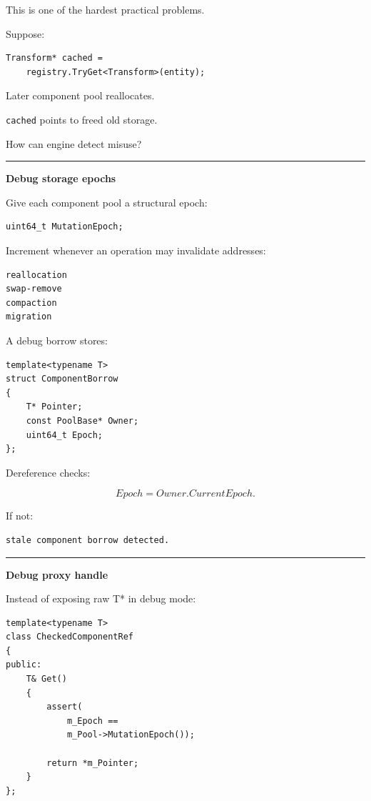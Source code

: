 This is one of the hardest practical problems.

Suppose:

\begin{verbatim}
Transform* cached =
    registry.TryGet<Transform>(entity);
\end{verbatim}

Later component pool reallocates.

\texttt{cached} points to freed old storage.

How can engine detect misuse?

\begin{center}\rule{0.5\linewidth}{0.5pt}\end{center}

\textbf{Debug storage epochs}

Give each component pool a structural epoch:

\begin{verbatim}
uint64_t MutationEpoch;
\end{verbatim}

Increment whenever an operation may invalidate addresses:

\begin{verbatim}
reallocation
swap-remove
compaction
migration
\end{verbatim}

A debug borrow stores:

\begin{verbatim}
template<typename T>
struct ComponentBorrow
{
    T* Pointer;
    const PoolBase* Owner;
    uint64_t Epoch;
};
\end{verbatim}

Dereference checks:

\[
Epoch=Owner.CurrentEpoch.
\]

If not:

\begin{verbatim}
stale component borrow detected.
\end{verbatim}

\begin{center}\rule{0.5\linewidth}{0.5pt}\end{center}

\textbf{Debug proxy handle}

Instead of exposing raw T* in debug mode:

\begin{verbatim}
template<typename T>
class CheckedComponentRef
{
public:
    T& Get()
    {
        assert(
            m_Epoch ==
            m_Pool->MutationEpoch());

        return *m_Pointer;
    }
};
\end{verbatim}


